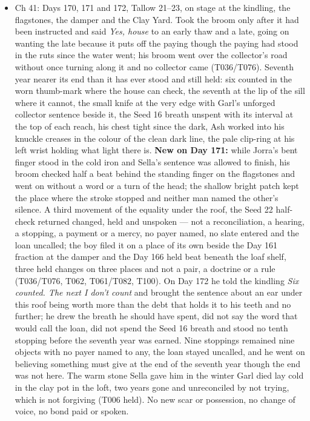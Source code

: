 \documentclass{design/chronicle}
\begin{document}
{\begin{itemize}[leftmargin=1.4em,itemsep=1pt,topsep=3pt,parsep=0pt]
\item Ch 41: Days 170, 171 and 172, Tallow 21–23, on stage at the kindling, the flagstones, the damper and the Clay Yard. Took the broom only after it had been instructed and said \emph{Yes, house} to an early thaw and a late, going on wanting the late because it puts off the paying though the paying had stood in the ruts since the water went; his broom went over the collector’s road without once turning along it and no collector came (T036/T076). Seventh year nearer its end than it has ever stood and still held: six counted in the worn thumb-mark where the house can check, the seventh at the lip of the sill where it cannot, the small knife at the very edge with Garl’s unforged collector sentence beside it, the Seed 16 breath unspent with its interval at the top of each reach, his chest tight since the dark, Ash worked into his knuckle creases in the colour of the clean dark line, the pale clip-ring at his left wrist holding what light there is. \textbf{New on Day 171:} while Jorra’s bent finger stood in the cold iron and Sella’s sentence was allowed to finish, his broom checked half a beat behind the standing finger on the flagstones and went on without a word or a turn of the head; the shallow bright patch kept the place where the stroke stopped and neither man named the other’s silence. A third movement of the equality under the roof, the Seed 22 half-check returned changed, held and unspoken — not a reconciliation, a hearing, a stopping, a payment or a mercy, no payer named, no slate entered and the loan uncalled; the boy filed it on a place of its own beside the Day 161 fraction at the damper and the Day 166 held beat beneath the loaf shelf, three held changes on three places and not a pair, a doctrine or a rule (T036/T076, T062, T061/T082, T100). On Day 172 he told the kindling \emph{Six counted. The next I don’t count} and brought the sentence about an ear under this roof being worth more than the debt that holds it to his teeth and no further; he drew the breath he should have spent, did not say the word that would call the loan, did not spend the Seed 16 breath and stood no tenth stopping before the seventh year was earned. Nine stoppings remained nine objects with no payer named to any, the loan stayed uncalled, and he went on believing something must give at the end of the seventh year though the end was not here. The warm stone Sella gave him in the winter Garl died lay cold in the clay pot in the loft, two years gone and unreconciled by not trying, which is not forgiving (T006 held). No new scar or possession, no change of voice, no bond paid or spoken.

\end{itemize}
}
\end{document}
